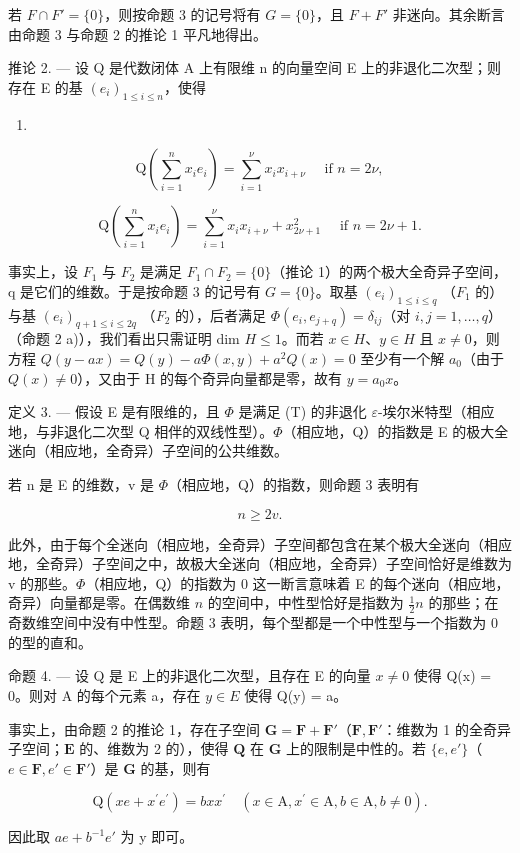 若 \(F \cap F' = \{0\}\)，则按命题 3 的记号将有 \(G = \{0\}\)，且 \(F + F'\) 非迷向。其余断言由命题 3 与命题 2 的推论 1 平凡地得出。

推论 2. --- 设 Q 是代数闭体 A 上有限维 n 的向量空间 E 上的非退化二次型；则存在 E 的基 \((e_i)_{1 \leqslant i \leqslant n}\)，使得

\begin{enumerate}
\def\labelenumi{(\arabic{enumi})}
\setcounter{enumi}{1}
\tightlist
\item
\end{enumerate}

\[
\mathrm{Q} (\sum_ {i = 1} ^ {n} x _ {i} e _ {i}) = \sum_ {i = 1} ^ {\nu} x _ {i} x _ {i + \nu} \quad \text {   if   } n = 2 \nu ,\tag{3}
\]

\[
\mathrm{Q} \left(\sum_ {i = 1} ^ {n} x _ {i} e _ {i}\right) = \sum_ {i = 1} ^ {\nu} x _ {i} x _ {i + \nu} + x _ {2 \nu + 1} ^ {2} \quad \text {   if   } n = 2 \nu + 1.
\]

事实上，设 \(F_{1}\) 与 \(F_{2}\) 是满足 \(F_{1} \cap F_{2} = \{0\}\)（推论 1）的两个极大全奇异子空间，q 是它们的维数。于是按命题 3 的记号有 \(G = \{0\}\)。取基 \((e_{i})_{1 \leqslant i \leqslant q}\) （\(F_{1}\) 的）与基 \((e_{i})_{q+1 \leqslant i \leqslant 2q}\) （\(F_{2}\) 的），后者满足 \(\Phi(e_{i}, e_{j+q}) = \delta_{ij}\)（对 \(i, j = 1, \ldots, q\)）（命题 2 a)），我们看出只需证明 dim \(H \leqslant 1\)。而若 \(x \in H\)、\(y \in H\) 且 \(x \neq 0\)，则方程 \(Q(y - ax) = Q(y) - a\Phi(x, y) + a^{2}Q(x) = 0\) 至少有一个解 \(a_{0}\)（由于 \(Q(x) \neq 0\)），又由于 H 的每个奇异向量都是零，故有 \(y = a_{0}x\)。

定义 3. --- 假设 E 是有限维的，且 \(\Phi\) 是满足 (T) 的非退化 \(\varepsilon\)-埃尔米特型（相应地，与非退化二次型 Q 相伴的双线性型）。\(\Phi\)（相应地，Q）的指数是 E 的极大全迷向（相应地，全奇异）子空间的公共维数。

若 n 是 E 的维数，v 是 \(\Phi\)（相应地，Q）的指数，则命题 3 表明有

\[
n \geqslant 2 v.\tag{4}
\]

此外，由于每个全迷向（相应地，全奇异）子空间都包含在某个极大全迷向（相应地，全奇异）子空间之中，故极大全迷向（相应地，全奇异）子空间恰好是维数为 v 的那些。\(\Phi\)（相应地，Q）的指数为 0 这一断言意味着 E 的每个迷向（相应地，奇异）向量都是零。在偶数维 \(n\) 的空间中，中性型恰好是指数为 \(\frac{1}{2} n\) 的那些；在奇数维空间中没有中性型。命题 3 表明，每个型都是一个中性型与一个指数为 0 的型的直和。

命题 4. --- 设 Q 是 E 上的非退化二次型，且存在 E 的向量 \(x \neq 0\) 使得 Q(x) = 0。则对 A 的每个元素 a，存在 \(y \in E\) 使得 Q(y) = a。

事实上，由命题 2 的推论 1，存在子空间 \(\mathbf{G} = \mathbf{F} + \mathbf{F}'\)（\(\mathbf{F}, \mathbf{F}'\)：维数为 1 的全奇异子空间；\(\mathbf{E}\) 的、维数为 2 的），使得 \(\mathbf{Q}\) 在 \(\mathbf{G}\) 上的限制是中性的。若 \(\{e, e'\}\)（\(e \in \mathbf{F}, e' \in \mathbf{F}'\)）是 \(\mathbf{G}\) 的基，则有

\[
\mathrm{Q} (x e + x ^ {\prime} e ^ {\prime}) = b x x ^ {\prime} \quad (x \in \mathrm{A}, x ^ {\prime} \in \mathrm{A}, b \in \mathrm{A}, b \neq 0).
\]

因此取 \(ae + b^{-1}e'\) 为 y 即可。
\relax{}
